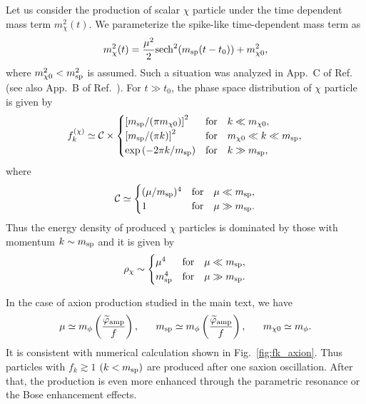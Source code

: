 \documentclass[12pt, a4paper]{article}
\begin{document}
Let us consider the production of scalar $\chi$ particle under the time dependent mass term $m_\chi^2(t)$.
We parameterize the spike-like time-dependent mass term as
\begin{align}
	m_\chi^2(t) = \frac{\mu^2}{2}{\rm sech}^2(m_{\rm sp}(t-t_0)) + m_{\chi 0}^2,
\end{align}
where $m_{\chi 0}^2 < m_{\rm sp}^2$ is assumed.
Such a situation was analyzed in App.~C of Ref.~\cite{Amin:2015ftc} (see also App.~B of Ref.~\cite{Ema:2016dny}).
For $t\gg t_0$, the phase space distribution of $\chi$ particle is given by
\begin{align}
	f^{(\chi)}_k \simeq \mathcal C \times \begin{cases}
		\left[m_{\rm sp}/(\pi m_{\chi 0}) \right]^2 & {\rm for}~~~k \ll m_{\chi 0},\\
		\left[m_{\rm sp}/(\pi k) \right]^2   & {\rm for}~~~m_{\chi 0}\ll k \ll m_{\rm sp},\\
		\exp\left(-2\pi k/m_{\rm sp}\right) & {\rm for}~~~k \gg m_{\rm sp},
	\end{cases}
\end{align}
where
\begin{align}
	\mathcal C \simeq 
	\begin{cases}
		(\mu/m_{\rm sp})^4   & {\rm for}~~~\mu \ll m_{\rm sp},\\
		1 & {\rm for}~~~\mu \gg m_{\rm sp}.
	\end{cases}
\end{align}
Thus the energy density of produced $\chi$ particles is dominated by those with momentum $k\sim m_{\rm sp}$ and
it is given by
\begin{align}
	\rho_\chi \sim  
	\begin{cases}
		\mu^4   & {\rm for}~~~\mu \ll m_{\rm sp},\\
		 m_{\rm sp}^4 & {\rm for}~~~\mu \gg m_{\rm sp}.
	\end{cases}
\end{align}

In the case of axion production studied in the main text, we have
\begin{align}
	\mu \simeq m_\phi\left(\frac{\widetilde\varphi_{\rm amp}}{f}\right),~~~~~m_{\rm sp} \simeq m_\phi\left(\frac{\widetilde\varphi_{\rm amp}}{f}\right),
	~~~~~m_{\chi 0} \simeq m_\phi.
\end{align}
It is consistent with numerical calculation shown in Fig.~\ref{fig:fk_axion}.
Thus particles with $f_k \gtrsim 1$ $(k < m_{\rm sp})$ are produced after one saxion oscillation.
After that, the production is even more enhanced through the parametric resonance or the Bose enhancement effects.
\end{document}
